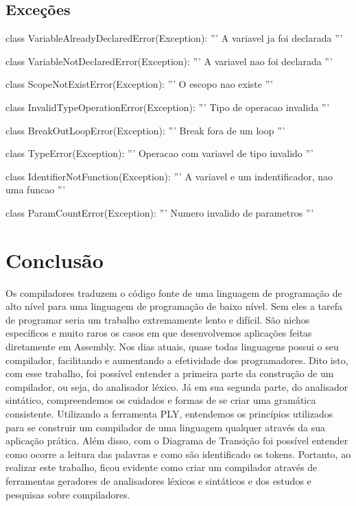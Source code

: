 \documentclass[
	12pt,				%
	openright,			%
	twoside,			%
	a4paper,			%
	english,			%
	french,				%
	spanish,			%
	brazil				%
	]{abntex2}
\begin{document}
\section{Exceções}
\begin{python}
    class VariableAlreadyDeclaredError(Exception):
        ''' A variavel ja foi declarada '''

    class VariableNotDeclaredError(Exception):
        ''' A variavel nao foi declarada '''

    class ScopeNotExistError(Exception):
        ''' O escopo nao existe '''

    class InvalidTypeOperationError(Exception):
        ''' Tipo de operacao invalida '''

    class BreakOutLoopError(Exception):
        ''' Break fora de um loop '''

    class TypeError(Exception):
        ''' Operacao com variavel de tipo invalido '''

    class IdentifierNotFunction(Exception):
        ''' A variavel e um indentificador, nao uma funcao '''

    class ParamCountError(Exception):
        ''' Numero invalido de parametros '''
\end{python}
\chapter*[Conclusão]{Conclusão}
Os compiladores traduzem o código fonte de uma linguagem de programação
de alto nível para uma linguagem de programação de baixo nível. Sem eles 
a tarefa de programar seria um trabalho extremamente lento e difícil.
São nichos específicos e muito raros os casos em que desenvolvemos
aplicações feitas diretamente em Assembly. Nos dias atuais, quase todas linguagens
possui o seu compilador, facilitando e aumentando a efetividade dos programadores.
Dito isto, com esse trabalho, foi possível entender a primeira parte da construção
de um compilador, ou seja, do analisador léxico. Já em sua segunda parte, do analisador sintático,
compreendemos os cuidados e formas de se criar uma gramática consistente. Utilizando a ferramenta PLY,
entendemos os princípios utilizados para se construir um compilador de uma
linguagem qualquer através da sua aplicação prática. Além disso, com o Diagrama
de Transição foi possível entender como ocorre a leitura das palavras e como são
identificado os tokens. Portanto, ao realizar este trabalho,
ficou evidente como criar um compilador através de ferramentas geradores de 
analisadores léxicos e sintáticos e dos estudos e pesquisas sobre compiladores.
\end{document}
